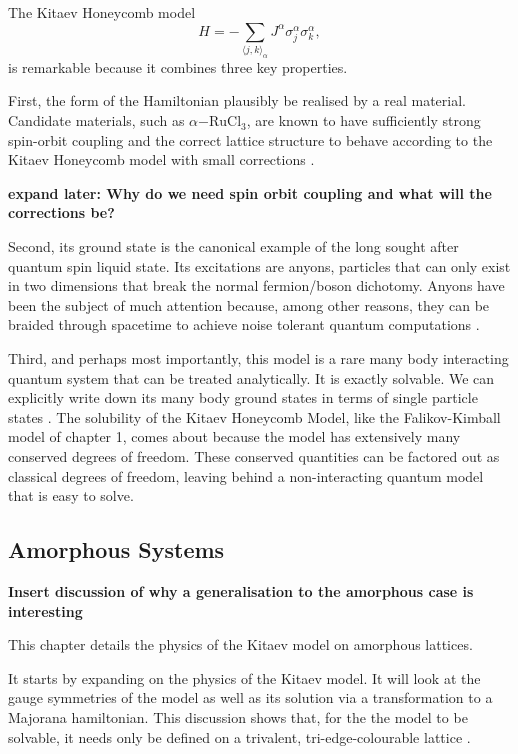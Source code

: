 The Kitaev Honeycomb model \[H =  - \sum_{\langle j,k\rangle_\alpha} J^{\alpha}\sigma_j^{\alpha}\sigma_k^{\alpha},\] is remarkable because it combines three key properties.

First, the form of the Hamiltonian plausibly be realised by a real material. Candidate materials, such as \(\alpha\mathrm{-RuCl}_3\), are known to have sufficiently strong spin-orbit coupling and the correct lattice structure to behave according to the Kitaev Honeycomb model with small corrections \autocite{banerjeeProximateKitaevQuantum2016,trebstKitaevMaterials2022}.

\textbf{expand later: Why do we need spin orbit coupling and what will the corrections be?}

Second, its ground state is the canonical example of the long sought after quantum spin liquid state. Its excitations are anyons, particles that can only exist in two dimensions that break the normal fermion/boson dichotomy. Anyons have been the subject of much attention because, among other reasons, they can be braided through spacetime to achieve noise tolerant quantum computations \autocite{freedmanTopologicalQuantumComputation2003}.

Third, and perhaps most importantly, this model is a rare many body interacting quantum system that can be treated analytically. It is exactly solvable. We can explicitly write down its many body ground states in terms of single particle states \autocite{kitaevAnyonsExactlySolved2006}. The solubility of the Kitaev Honeycomb Model, like the Falikov-Kimball model of chapter 1, comes about because the model has extensively many conserved degrees of freedom. These conserved quantities can be factored out as classical degrees of freedom, leaving behind a non-interacting quantum model that is easy to solve.

\hypertarget{amorphous-systems}{%
\subsection{Amorphous Systems}\label{amorphous-systems}}

\textbf{Insert discussion of why a generalisation to the amorphous case is interesting}

This chapter details the physics of the Kitaev model on amorphous lattices.

It starts by expanding on the physics of the Kitaev model. It will look at the gauge symmetries of the model as well as its solution via a transformation to a Majorana hamiltonian. This discussion shows that, for the the model to be solvable, it needs only be defined on a trivalent, tri-edge-colourable lattice \autocite{Nussinov2009}.

